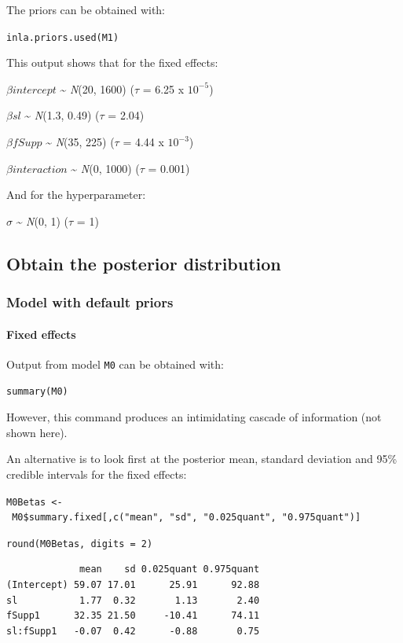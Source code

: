\documentclass[
]{book}
\begin{document}
The priors can be obtained with:

\texttt{inla.priors.used(M1)}

This output shows that for the fixed effects:

\(\beta intercept\) \textasciitilde{} \emph{N}(20, 1600) (\(\tau\) = 6.25 x \(10^{-5}\))

\(\beta sl\) \textasciitilde{} \emph{N}(1.3, 0.49) (\(\tau\) = 2.04)

\(\beta fSupp\) \textasciitilde{} \emph{N}(35, 225) (\(\tau\) = 4.44 x \(10^{-3}\))

\(\beta interaction\) \textasciitilde{} \emph{N}(0, 1000) (\(\tau\) = 0.001)

And for the hyperparameter:

\(\sigma\) \textasciitilde{} \emph{N}(0, 1) (\(\tau\) = 1)

\hypertarget{obtain-the-posterior-distribution}{%
\subsection{Obtain the posterior distribution}\label{obtain-the-posterior-distribution}}

\hypertarget{model-with-default-priors}{%
\subsubsection{Model with default priors}\label{model-with-default-priors}}

\hypertarget{fixed-effects}{%
\paragraph{Fixed effects}\label{fixed-effects}}

Output from model \texttt{M0} can be obtained with:

\texttt{summary(M0)}

However, this command produces an intimidating cascade of information (not shown here).

An alternative is to look first at the posterior mean, standard deviation and 95\% credible intervals for the fixed effects:

\texttt{M0Betas\ \textless{}-\ M0\$summary.fixed{[},c("mean",\ "sd",\ "0.025quant",\ "0.975quant"){]}}

\texttt{round(M0Betas,\ digits\ =\ 2)}

\begin{verbatim}
             mean    sd 0.025quant 0.975quant
(Intercept) 59.07 17.01      25.91      92.88
sl           1.77  0.32       1.13       2.40
fSupp1      32.35 21.50     -10.41      74.11
sl:fSupp1   -0.07  0.42      -0.88       0.75
\end{verbatim}
\end{document}

